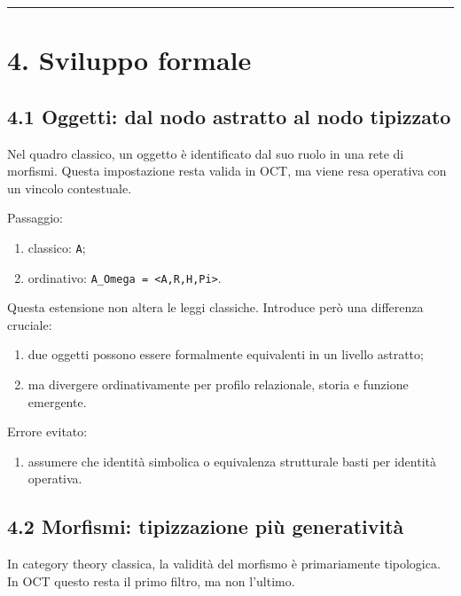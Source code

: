\begin{center}\rule{0.5\linewidth}{0.5pt}\end{center}

\section{4. Sviluppo formale}

\subsection{4.1 Oggetti: dal nodo astratto al nodo tipizzato}

Nel quadro classico, un oggetto è identificato dal suo ruolo in una rete di morfismi. Questa impostazione resta valida in OCT, ma viene resa operativa con un vincolo contestuale.

Passaggio:

\begin{enumerate}
\def\labelenumi{\arabic{enumi}.}
\tightlist
\item
  classico: \texttt{A};
\item
  ordinativo: \texttt{A\_Omega\ =\ \textless{}A,R,H,Pi\textgreater{}}.
\end{enumerate}

Questa estensione non altera le leggi classiche. Introduce però una differenza cruciale:

\begin{enumerate}
\def\labelenumi{\arabic{enumi}.}
\tightlist
\item
  due oggetti possono essere formalmente equivalenti in un livello astratto;
\item
  ma divergere ordinativamente per profilo relazionale, storia e funzione emergente.
\end{enumerate}

Errore evitato:

\begin{enumerate}
\def\labelenumi{\arabic{enumi}.}
\tightlist
\item
  assumere che identità simbolica o equivalenza strutturale basti per identità operativa.
\end{enumerate}

\subsection{4.2 Morfismi: tipizzazione più generatività}

In category theory classica, la validità del morfismo è primariamente tipologica. In OCT questo resta il primo filtro, ma non l'ultimo.

